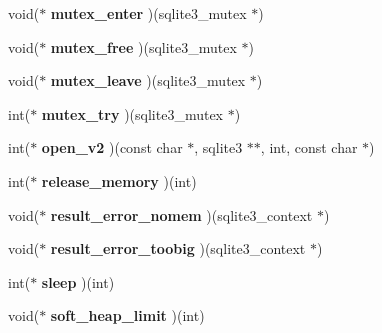 \begin{DoxyCompactItemize}
void($\ast$ {\bfseries mutex\+\_\+enter} )(sqlite3\+\_\+mutex $\ast$)
\item 
\mbox{\label{structsqlite3__api__routines_acbc66bc0d281c1b113c455409bdce8ad}} 
void($\ast$ {\bfseries mutex\+\_\+free} )(sqlite3\+\_\+mutex $\ast$)
\item 
\mbox{\label{structsqlite3__api__routines_a7d02b385cc7de28a4a12cc2893d51f0a}} 
void($\ast$ {\bfseries mutex\+\_\+leave} )(sqlite3\+\_\+mutex $\ast$)
\item 
\mbox{\label{structsqlite3__api__routines_aa3eed04dafa14724d23f3e74a6891575}} 
int($\ast$ {\bfseries mutex\+\_\+try} )(sqlite3\+\_\+mutex $\ast$)
\item 
\mbox{\label{structsqlite3__api__routines_a1e6684ec7752ca3aea64da0049490083}} 
int($\ast$ {\bfseries open\+\_\+v2} )(const char $\ast$, sqlite3 $\ast$$\ast$, int, const char $\ast$)
\item 
\mbox{\label{structsqlite3__api__routines_a34fba43ed54a03e129804659ccb379d1}} 
int($\ast$ {\bfseries release\+\_\+memory} )(int)
\item 
\mbox{\label{structsqlite3__api__routines_a51e4c10c9ad6aa8b2925cac3b07db982}} 
void($\ast$ {\bfseries result\+\_\+error\+\_\+nomem} )(sqlite3\+\_\+context $\ast$)
\item 
\mbox{\label{structsqlite3__api__routines_a8d8d0f8b76631dc4c976caf8e4b69714}} 
void($\ast$ {\bfseries result\+\_\+error\+\_\+toobig} )(sqlite3\+\_\+context $\ast$)
\item 
\mbox{\label{structsqlite3__api__routines_a87cb2a664bb94f1a96fd4c3bf02a5e25}} 
int($\ast$ {\bfseries sleep} )(int)
\item 
\mbox{\label{structsqlite3__api__routines_a720a37e18110008f32c32b43e6df7bd6}} 
void($\ast$ {\bfseries soft\+\_\+heap\+\_\+limit} )(int)
\item 
\mbox{\label{structsqlite3__api__routines_a86ef5c166aac6ae6fe3ccbdaca51509b}} 
$$
\end{DoxyCompactItemize}
